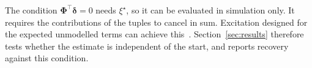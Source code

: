 The condition $\boldsymbol\Phi^\top\boldsymbol\delta=0$ needs $\xi^\star$, so
it can be evaluated in simulation only.
It requires the contributions of the tuples to cancel in sum.
Excitation designed for the expected unmodelled terms can achieve
this~\cite[Remark~5]{gyorok2026obc}.
Section~\ref{sec:results} therefore tests whether the estimate is independent
of the start, and reports recovery against this condition.
